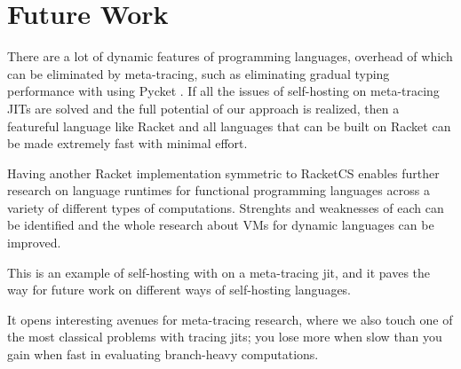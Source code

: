     \section[\texorpdfstring{Future Work}{Future Work}]{Future Work}

        \begin{paragraph-here}%
            There are a lot of dynamic features of programming languages, overhead of which can be eliminated by meta-tracing, such as eliminating gradual typing performance with using Pycket \cite{pycketmain2}. If all the issues of self-hosting on meta-tracing JITs are solved and the full potential of our approach is realized, then a featureful language like Racket and all languages that can be built on Racket can be made extremely fast with minimal effort.
        \end{paragraph-here}

        \begin{paragraph-here}%
            Having another Racket implementation symmetric to RacketCS enables further research on language runtimes for functional programming languages across a variety of different types of computations. Strenghts and weaknesses of each can be identified and the whole research about VMs for dynamic languages can be improved.
        \end{paragraph-here}

        \begin{paragraph-here}%
            This is an example of self-hosting with on a meta-tracing \gls{jit}, and it paves the way for future work on different ways of self-hosting languages.
        \end{paragraph-here}

        \begin{paragraph-here}%
            It opens interesting avenues for meta-tracing research, where we also touch one of the most classical problems with tracing \glspl{jit}; you lose more when slow than you gain when fast in evaluating branch-heavy computations.
        \end{paragraph-here}
